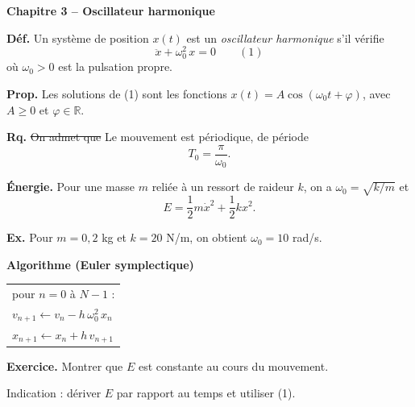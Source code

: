 \documentclass[11pt,a4paper]{article}
\begin{document}
\textbf{\Large Chapitre 3 -- Oscillateur harmonique}

\textbf{Déf.} Un système de position $x(t)$ est un \emph{oscillateur harmonique} s'il vérifie
\[ \ddot{x} + \omega_0^2\, x = 0 \qquad (1) \]
où $\omega_0 > 0$ est la pulsation propre.

\textbf{Prop.} Les solutions de (1) sont les fonctions $x(t) = A\cos(\omega_0 t + \varphi)$, avec $A \geq 0$ et $\varphi \in \mathbb{R}$.

\textbf{Rq.} \sout{On admet que} Le mouvement est périodique, de période
\[ T_0 = \frac{\pi}{\omega_0}. \]

\textbf{Énergie.} Pour une masse $m$ reliée à un ressort de raideur $k$, on a $\omega_0 = \sqrt{k/m}$ et
\[ E = \frac{1}{2} m \dot{x}^2 + \frac{1}{2} k x^2 . \]

\newpage
\textbf{Ex.} Pour $m = 0{,}2$ kg et $k = 20$ N/m, on obtient $\omega_0 = 10$ rad/s.

\textbf{Algorithme (Euler symplectique)}

\begin{tabular}{l}
pour $n = 0$ à $N-1$ : \\
\quad $v_{n+1} \leftarrow v_n - h\,\omega_0^2\, x_n$ \\
\quad $x_{n+1} \leftarrow x_n + h\, v_{n+1}$ \\
\end{tabular}

\textbf{Exercice.} Montrer que $E$ est constante au cours du mouvement.

Indication : dériver $E$ par rapport au temps et utiliser (1).
\end{document}
